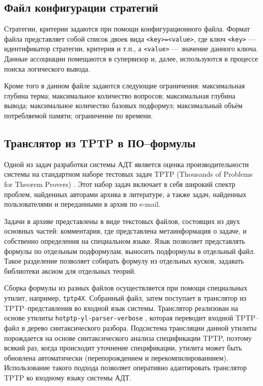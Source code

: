 \subsection{Файл конфигурации стратегий}
Стратегии, критерии задаются при помощи конфигурационного файла. Формат файла представляет собой список двоек вида \texttt{<key>=<value>}, где ключ \texttt{<key>} --- идентификатор стратегии, критерия и т.п., а \texttt{<value>} --- значение данного ключа. Данные ассоциации помещаются в супервизор и, далее, используются в процессе поиска логического вывода.

Кроме того в данном файле задаются следующие ограничения: максимальная глубина терма; максимальное количество вопросов; максимальная глубина вывода; максимальное количество базовых подформул; максимальный объём потребляемой памяти; ограничение по времени.


\subsection{Транслятор из TPTP в ПО--формулы}
Одной из задач разработки системы АДТ является оценка производительности системы на стандартном наборе тестовых задач TPTP (Thousands of Problems for Theorem Provers) \cite{tptp}. Этот набор задач включает в себя широкий спектр проблем, найденных авторами архива в литературе, а также задач, найденных пользователями и переданными в архив по e-mail.

Задачи в архиве представлены в виде текстовых файлов, состоящих из двух основных частей: комментария, где представлена метаинформация о задаче, и собственно определения на специальном языке. Язык позволяет представлять формулы по отдельным подформулам, выносить подформулы в отдельный файл. Такое разделение позволяет собирать формулу из отдельных кусков, задавать библиотеки аксиом для отдельных теорий.

Сборка формулы из разных файлов осуществляется при помощи специальных утилит, например, \texttt{tptp4X}. Собранный файл, затем поступает в транслятор из TPTP--представления во входной язык системы. Транслятор реализован на основе утилиты \texttt{hotptp-yl-parser-verbose} \cite{TPTPTrans}, которая переводит входной TPTP--файл в дерево синтаксического разбора. Подсистема трансляции данной утилиты порождается на основе синтаксического анализа спецификации TPTP, поэтому всякий раз, когда происходит уточнение спецификации, утилита может быть обновлена автоматически (перепорождением и перекомпилированнием). Использование такого подхода позволяет оперативно адаптировать транслятор TPTP ко входному языку системы АДТ.

